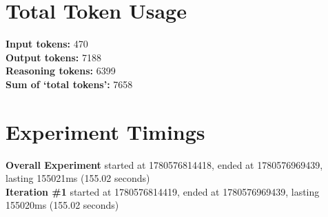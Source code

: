 \documentclass{article}
\begin{document}
\section*{Total Token Usage}
\textbf{Input tokens: }470
\\\textbf{Output tokens: }7188
\\\textbf{Reasoning tokens: }6399
\\\textbf{Sum of `total tokens': }7658
\section*{Experiment Timings}
\textbf{Overall Experiment} started at 1780576814418, ended at 1780576969439, lasting 155021ms (155.02 seconds)
\\\textbf{Iteration \#1} started at 1780576814419, ended at 1780576969439, lasting 155020ms (155.02 seconds)
\end{document}

